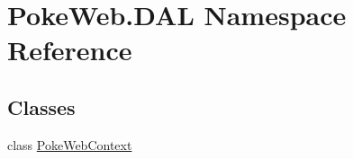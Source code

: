 \hypertarget{namespace_poke_web_1_1_d_a_l}{}\section{Poke\+Web.\+D\+AL Namespace Reference}
\label{namespace_poke_web_1_1_d_a_l}
\subsection*{Classes}
\begin{DoxyCompactItemize}
\item 
class \mbox{\hyperlink{class_poke_web_1_1_d_a_l_1_1_poke_web_context}{Poke\+Web\+Context}}
\end{DoxyCompactItemize}
